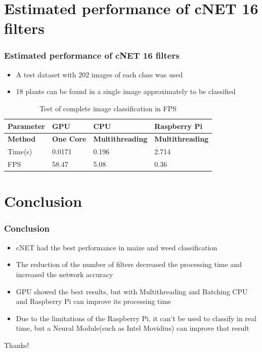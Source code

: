 \documentclass[10pt,a4paper]{beamer}
\begin{document}
\section{Estimated performance of cNET 16 filters}
\begin{frame}
\frametitle{Estimated performance of cNET 16 filters}
\begin{itemize}
	\item A test dataset with 202 images of each class was used
	\item 18 plants can be found in a single image approximately to be classified
\end{itemize}
\begin{table}[h!]
\centering
\renewcommand{\arraystretch}{1.2}
\caption{Test of complete image classification in FPS}
\label{table:6}
\begin{tabular}[c c c c]{|p{1.8 cm} p{1.5cm} p{2.1cm} p{2.3cm}|} 
 \hline
 \textbf{Parameter} &\textbf{GPU } & \textbf{CPU} & \textbf{Raspberry Pi} \\ 
 \hline
  \textbf{Method} &\textbf{One Core} & \textbf{Multithreading} & \textbf{Multithreading} \\ 
 \hline
 Time(s) & 0.0171 & 0.196 & 2.714 \\ [0.95ex]
 FPS & 58.47 & 5.08 & 0.36 \\ [0.95ex]
 \hline
\end{tabular}
\end{table}
\end{frame}
\section{Conclusion}
\begin{frame}
\frametitle{Conclusion}
\begin{itemize}
\item cNET had the best performance in maize and weed classification
\item The reduction of the number of filters decreased the processing time and increased the network accuracy 
\item GPU showed the best results, but with Multithreading and Batching CPU and Raspberry Pi can improve its processing time
\item Due to the limitations of the Raspberry Pi, it can't be used to classify in real time, but a Neural Module(such as Intel Movidius) can improve that result
\end{itemize}
\end{frame}
\large
\begin{frame}
\begin{center}
Thanks!
\end{center}
\end{frame}

%
%
\end{document}
